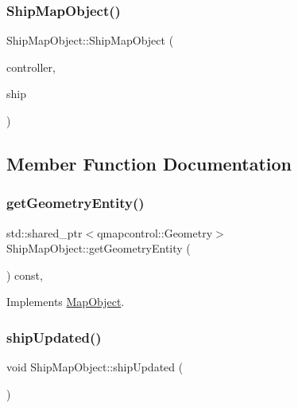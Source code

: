 \subsubsection{\texorpdfstring{ShipMapObject()}{ShipMapObject()}}
{\footnotesize\ttfamily Ship\+Map\+Object\+::\+Ship\+Map\+Object (\begin{DoxyParamCaption}\item[{\mbox{\hyperlink{class_map_objects_controller}{Map\+Objects\+Controller}} $\ast$}]{controller,  }\item[{\mbox{\hyperlink{class_ship_data}{Ship\+Data}} $\ast$}]{ship }\end{DoxyParamCaption})}



\subsection{Member Function Documentation}
\mbox{\label{class_ship_map_object_aaa5699009b3f1bc4d1c2a64ac3eb445c}} 
\subsubsection{\texorpdfstring{getGeometryEntity()}{getGeometryEntity()}}
{\footnotesize\ttfamily std\+::shared\+\_\+ptr$<$qmapcontrol\+::\+Geometry$>$ Ship\+Map\+Object\+::get\+Geometry\+Entity (\begin{DoxyParamCaption}{ }\end{DoxyParamCaption}) const\hspace{0.3cm}{\ttfamily [inline]}, {\ttfamily [virtual]}}



Implements \mbox{\hyperlink{class_map_object_a82e055e41c862ec8d80d5bfb137b3253}{Map\+Object}}.

\mbox{\label{class_ship_map_object_a33a93050d90d8580beacdeb7f5593a2e}} 
\subsubsection{\texorpdfstring{shipUpdated()}{shipUpdated()}}
{\footnotesize\ttfamily void Ship\+Map\+Object\+::ship\+Updated (\begin{DoxyParamCaption}{ }\end{DoxyParamCaption})}

